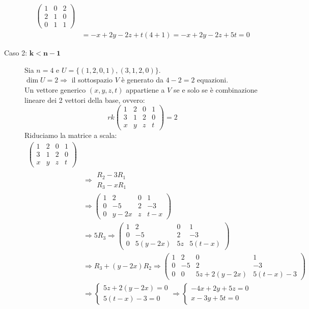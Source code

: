 \documentclass[a4paper]{article}
\theoremstyle{definition}
\begin{document}
\begin{description}
\begin{align*}
\begin{pmatrix}
			1 & 0 & 2 \\
			2 & 1 & 0 \\
			0 & 1 & 1
		\end{pmatrix} \\
		&= - x + 2y - 2z + t(4 + 1) = - x + 2y - 2z + 5t = 0
	\end{align*}
	\item[Caso 2: $\mathbf{k < n - 1}$] Sia $n = 4$ e $U = \{(1, 2, 0, 1), (3, 1, 2, 0)\}$. \\
	$\dim U = 2 \Rightarrow$ il sottospazio $V$ è generato da $4 - 2 = 2$ equazioni. \\
	Un vettore generico $(x, y, z, t)$ appartiene a $V$ se e solo se è combinazione lineare dei 2 vettori della base, ovvero:
	\[rk\begin{pmatrix}
			1 & 2 & 0 & 1 \\
			3 & 1 & 2 & 0 \\
			x & y & z & t
		\end{pmatrix} = 2\]
	Riduciamo la matrice a scala:
	\begin{align*}
		\begin{pmatrix}
			1 & 2 & 0 & 1 \\
			3 & 1 & 2 & 0 \\
			x & y & z & t
		\end{pmatrix} \\
		&\Rightarrow \begin{matrix}
			R_2 - 3R_1 \\
			R_3 - xR_1
		\end{matrix} \\
		&\Rightarrow \begin{pmatrix}
			1 & 2 & 0 & 1 \\
			0 & -5 & 2 & -3 \\
			0 & y - 2x & z & t - x
		\end{pmatrix} \\
		&\Rightarrow 5R_3 \Rightarrow \begin{pmatrix}
			1 & 2 & 0 & 1 \\
			0 & -5 & 2 & -3 \\
			0 & 5(y - 2x) & 5z & 5(t - x)
		\end{pmatrix} \\
		&\Rightarrow R_3 + (y - 2x)R_2 \Rightarrow \begin{pmatrix}
			1 & 2 & 0 & 1 \\
			0 & -5 & 2 & -3 \\
			0 & 0 & 5z + 2(y - 2x) & 5(t - x) - 3
		\end{pmatrix} \\
		&\Rightarrow \begin{cases}
			5z + 2(y - 2x) = 0 \\
			5(t - x) - 3 = 0
		\end{cases} \Rightarrow \begin{cases}
			- 4x + 2y + 5z = 0 \\
			x - 3y + 5t = 0
		\end{cases}
	\end{align*}
\end{description}
\end{document}
